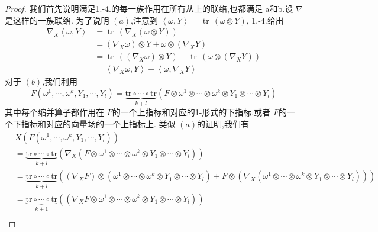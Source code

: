 \documentclass[../../几何与拓扑.tex]{subfiles}
\begin{document}
\begin{proof}
    我们首先说明满足1.-4.的每一族作用在所有从上的联络,也都满足 a和b.设 \(   \nabla   \)是这样的一族联络.
    为了说明 \(  \left( a \right)   \),注意到 \(  \left< \omega ,Y \right>= \operatorname{tr}\,\left(  \omega \otimes Y \right)   \), 1.-4.给出
    \begin{equation}
        \begin{aligned}
            \nabla _{X} \left< \omega ,Y \right>& =  \operatorname{tr}\,\left(  \nabla _{X} \left(  \omega \otimes Y \right)  \right)\\ 
            & =  \left(  \nabla _{X}  \omega  \right)\otimes Y +   \omega \otimes \left(  \nabla _{X}Y \right)    \\ 
             & =  \operatorname{tr}\,\left( \left(  \nabla _{X} \omega  \right)\otimes Y  \right) +  \operatorname{tr}\,\left(  \omega \otimes \left(  \nabla _{X}Y \right)  \right)\\ 
              & =  \left< \nabla _{X} \omega ,Y \right> + \left< \omega ,  \nabla _{X}Y \right>    
        \end{aligned}
    \end{equation} 对于 \(  \left( b \right)   \),我们利用 \[
    F\left(  \omega^1,\cdots,\omega^k , Y_1,\cdots,Y_l  \right)=  \underbrace{\mathrm{tr}\circ \cdots \circ \mathrm{tr}}_{k+ l} \left( F\otimes  \omega ^{1}\otimes \cdots \otimes  \omega ^{k}\otimes Y_1\otimes \cdots \otimes Y_{l} \right) 
    \]其中每个缩并算子都作用在 \(  F  \)的一个上指标和对应的1-形式的下指标,或者 \(  F  \)的一个下指标和对应的向量场的一个上指标上.   
    类似 \(  \left( a \right)   \)的证明,我们有 \[
    \begin{aligned}
  &  X \left( F\left(  \omega^1,\cdots,\omega^k , Y_1,\cdots,Y_l  \right)  \right) \\ 
     & =     \underbrace{\mathrm{tr}\circ \cdots \circ \mathrm{tr}}_{k+ l}\left(  \nabla _{X} \left( F\otimes  \omega ^{1}\otimes \cdots \otimes  \omega ^{k}\otimes Y_1\otimes \cdots \otimes Y_{l} \right)  \right)\\ 
      & =   \underbrace{\mathrm{tr}\circ \cdots \circ \mathrm{tr}}_{k+ l} \left( \left(  \nabla _{X}F \right)\otimes  \left(  \omega ^{1}\otimes \cdots \otimes  \omega ^{k}\otimes Y_1\otimes \cdots \otimes Y_{l} \right) +  F\otimes \left(  \nabla _{X}\left(  \omega ^{1}\otimes \cdots \otimes  \omega ^{k}\otimes Y_1\otimes \cdots \otimes Y_{l} \right)  \right)    \right) \\ 
       & =  \underbrace{\mathrm{tr}\circ \cdots \circ \mathrm{tr}}_{k+ 1}\left( \left(  \nabla _{X}F\otimes  \omega ^{1}\otimes \cdots \otimes  \omega ^{k}\otimes Y_1\otimes \cdots \otimes Y_{l} \right)  \right) \\ 

\end{aligned}\]
\end{proof}
\end{document}
